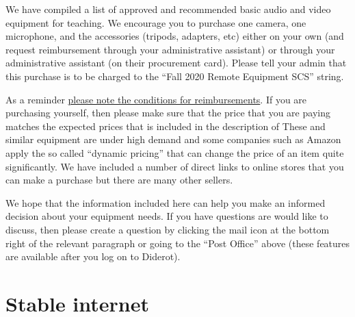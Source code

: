 \begin{gram}
\label{grm:equipment::preamble}
We have compiled a list of approved and recommended basic audio and video
equipment for teaching.
%
We encourage you to purchase one camera, one microphone, and the accessories (tripods, adapters, etc) either on your own (and request reimbursement through your administrative assistant) or through your administrative assistant (on their procurement card). Please tell your admin that this purchase is to be charged to the ``Fall 2020 Remote Equipment SCS'' string. 

As a reminder
\href{ch:intro::purchase}{please note the conditions for reimbursements}.
%
If you are purchasing yourself, then please make sure that the price
that you are paying matches the expected prices that is included in
the description of
%
These and similar equipment are under high demand and some companies
such as Amazon apply the so called ``dynamic pricing'' that can change
the price of an item quite significantly.
%
We have included a number of direct links to online stores that you can make a purchase but there are many other sellers. 


We hope that the information included here can help you make an informed decision about your equipment needs.
%
If you have questions are would like to discuss, then please create a
question by clicking the mail icon at the bottom right of the relevant
paragraph or going to the ``Post Office'' above (these features are
available after you log on to Diderot).

\end{gram}

\section{Stable internet}
\label{sec:equipment::internet}

